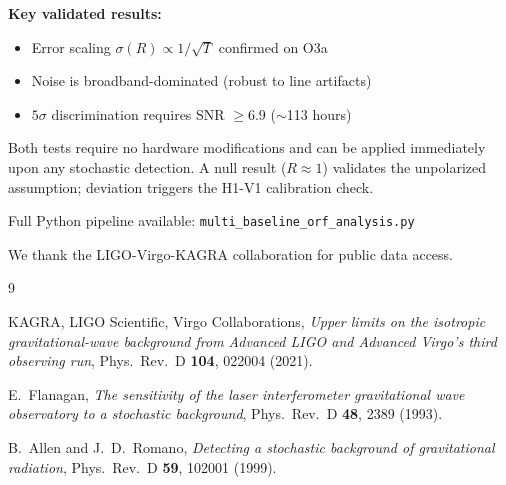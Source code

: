 \documentclass[twocolumn,prd,superscriptaddress,nofootinbib]{revtex4-2}
\begin{document}
\textbf{Key validated results:}
\begin{itemize}
\item Error scaling $\sigma(R) \propto 1/\sqrt{T}$ confirmed on O3a
\item Noise is broadband-dominated (robust to line artifacts)
\item $5\sigma$ discrimination requires SNR $\geq 6.9$ ($\sim$113 hours)
\end{itemize}

Both tests require no hardware modifications and can be applied immediately upon any stochastic detection. A null result ($R \approx 1$) validates the unpolarized assumption; deviation triggers the H1-V1 calibration check.

Full Python pipeline available: \texttt{multi\_baseline\_orf\_analysis.py}

\begin{acknowledgments}
We thank the LIGO-Virgo-KAGRA collaboration for public data access.
\end{acknowledgments}



\begin{thebibliography}{9}

KAGRA, LIGO Scientific, Virgo Collaborations,
\emph{Upper limits on the isotropic gravitational-wave background from Advanced LIGO and Advanced Virgo's third observing run},
Phys.\ Rev.\ D \textbf{104}, 022004 (2021).

E.~Flanagan,
\emph{The sensitivity of the laser interferometer gravitational wave observatory to a stochastic background},
Phys.\ Rev.\ D \textbf{48}, 2389 (1993).

B.~Allen and J.~D.~Romano,
\emph{Detecting a stochastic background of gravitational radiation},
Phys.\ Rev.\ D \textbf{59}, 102001 (1999).

\end{thebibliography}
\end{document}
